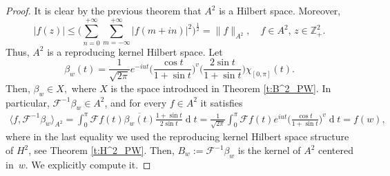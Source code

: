 \documentclass[12pt,a4paper,reqno]{amsart}
\theoremstyle{definition}
\theoremstyle{definition}\newtheorem{defn}[thm]{Definition}
\newcommand{\nb}[3]{{\colorbox{#2}{\bfseries\sffamily\scriptsize\textcolor{white}{#1}}} 
    {\textcolor{#2}{\sf\small\textit{#3}}}}
\newcommand{\eug}[1]{\nb{Eug}{jazzberryjam}{#1}}
\newcommand{\ale}[1]{\nb{Ale}{teal}{#1}}
\begin{document}
    \begin{proof}
    It is clear by the previous theorem that $A^2$ is a Hilbert space. Moreover, 
    \[
    |f(z)|\leqslant \Big(\sum_{n=0}^{+\infty}\sum_{m=-\infty}^{+\infty}|f(m+in)|^2\Big)^{\frac 12}=\|f\|_{A^2},\quad  f\in A^2,\, z\in\mathbb Z^2_+.
    \]
    Thus, $A^2$ is a reproducing kernel Hilbert space. Let
    \begin{equation*}
         \beta_w(t)=\frac{1}{\sqrt{2\pi}} e^{-iut}\Big(\frac{\cos t}{1+\sin t}\Big)^v\Big(\frac{2\sin t}{1+\sin t}\Big)\chi_{[0,\pi]}(t).
    \end{equation*}
    Then, $\beta_w\in X,$ where $X$ is the space introduced in Theorem \ref{t:B^2_PW}. In particular, $\mathcal{F}^{-1}\beta_w\in A^2$, and for every $f\in A^2$ it satisfies
    \begin{align*}
        \langle f,\mathcal{F}^{-1}\beta_w\rangle_{A^2}=\int_0^\pi\mathcal{F}f(t)\overline{\beta_w(t)}\frac{1+\sin t}{2\sin t}\operatorname{d}\!t=\frac{1}{\sqrt{2\pi}}\int_0^\pi\mathcal{F}f(t)e^{iut}\Big(\frac{\cos t}{1+\sin t}\Big)^v\operatorname{d}\!t=f(w),
        \end{align*}
        where in the last equality we used the reproducing kernel Hilbert space structure of $H^2$, see Theorem \ref{t:H^2_PW}. Then, $B_w:=\mathcal{F}^{-1}\beta_w$ is the kernel of $A^2$ centered in~$w$. We explicitly compute it. 

\end{proof}
\end{document}
